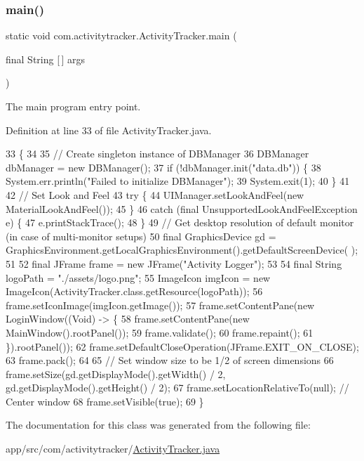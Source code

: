 \subsubsection{\texorpdfstring{main()}{main()}}
{\footnotesize\ttfamily static void com.\+activitytracker.\+Activity\+Tracker.\+main (\begin{DoxyParamCaption}\item[{final String \mbox{[}$\,$\mbox{]}}]{args }\end{DoxyParamCaption})\hspace{0.3cm}{\ttfamily [static]}}

The main program entry point. 

Definition at line 33 of file Activity\+Tracker.\+java.


\begin{DoxyCode}
33                                                  \{
34 
35         \textcolor{comment}{// Create singleton instance of DBManager}
36         DBManager dbManager = \textcolor{keyword}{new} DBManager();
37         \textcolor{keywordflow}{if} (!dbManager.init(\textcolor{stringliteral}{"data.db"})) \{
38             System.err.println(\textcolor{stringliteral}{"Failed to initialize DBManager"});
39             System.exit(1);
40         \}
41 
42         \textcolor{comment}{// Set Look and Feel}
43         \textcolor{keywordflow}{try} \{
44             UIManager.setLookAndFeel(\textcolor{keyword}{new} MaterialLookAndFeel());
45         \}
46         \textcolor{keywordflow}{catch} (\textcolor{keyword}{final} UnsupportedLookAndFeelException e) \{
47             e.printStackTrace();
48         \}
49         \textcolor{comment}{// Get desktop resolution of default monitor (in case of multi-monitor setups)}
50         \textcolor{keyword}{final} GraphicsDevice gd = GraphicsEnvironment.getLocalGraphicsEnvironment().getDefaultScreenDevice(
      );
51 
52         \textcolor{keyword}{final} JFrame frame = \textcolor{keyword}{new} JFrame(\textcolor{stringliteral}{"Activity Logger"});
53 
54         \textcolor{keyword}{final} String logoPath = \textcolor{stringliteral}{"./assets/logo.png"};
55         ImageIcon imgIcon = \textcolor{keyword}{new} ImageIcon(ActivityTracker.class.getResource(logoPath));
56         frame.setIconImage(imgIcon.getImage());
57         frame.setContentPane(\textcolor{keyword}{new} LoginWindow((Void) -> \{
58             frame.setContentPane(\textcolor{keyword}{new} MainWindow().rootPanel());
59             frame.validate();
60             frame.repaint();
61         \}).rootPanel());
62         frame.setDefaultCloseOperation(JFrame.EXIT\_ON\_CLOSE);
63         frame.pack();
64 
65         \textcolor{comment}{// Set window size to be 1/2 of screen dimensions}
66         frame.setSize(gd.getDisplayMode().getWidth() / 2, gd.getDisplayMode().getHeight() / 2);
67         frame.setLocationRelativeTo(null); \textcolor{comment}{// Center window}
68         frame.setVisible(\textcolor{keyword}{true});
69     \}
\end{DoxyCode}


The documentation for this class was generated from the following file\+:\begin{DoxyCompactItemize}
\item 
app/src/com/activitytracker/\mbox{\hyperlink{_activity_tracker_8java}{Activity\+Tracker.\+java}}\end{DoxyCompactItemize}
